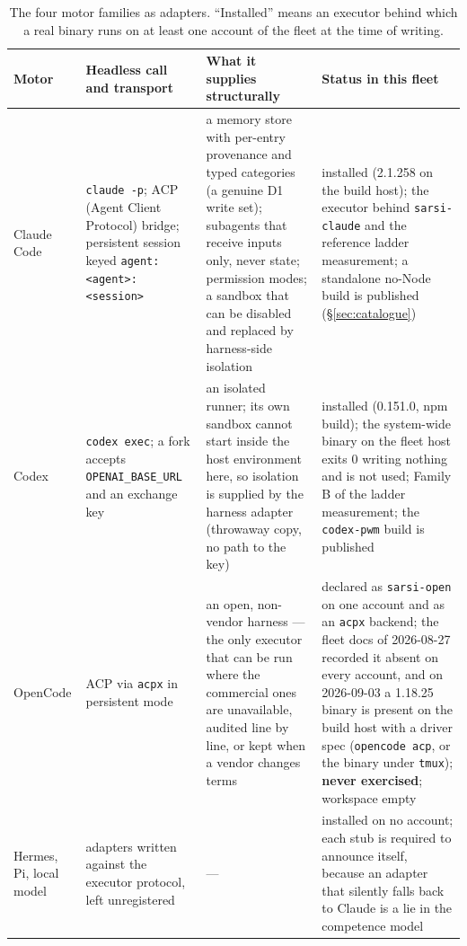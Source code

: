 \documentclass[11pt]{article}
\theoremstyle{definition}
\begin{document}
\begin{table}[H]
\centering\small
\begin{tabularx}{\textwidth}{@{}lYYY@{}}
\toprule
Motor & Headless call and transport & What it supplies structurally & Status in this fleet \\
\midrule
Claude Code & \texttt{claude -p}; ACP (Agent Client Protocol) bridge; persistent session keyed \texttt{agent:}\allowbreak\texttt{<agent>:}\allowbreak\texttt{<session>} & a memory store with per-entry provenance and typed categories (a genuine D1 write set); subagents that receive inputs only, never state; permission modes; a sandbox that can be disabled and replaced by harness-side isolation & installed (2.1.258 on the build host); the executor behind \texttt{sarsi-claude} and the reference ladder measurement; a standalone no-Node build is published (\S\ref{sec:catalogue}) \\
Codex & \texttt{codex exec}; a fork accepts \texttt{OPENAI\_BASE\_URL} and an exchange key & an isolated runner; its own sandbox cannot start inside the host environment here, so isolation is supplied by the harness adapter (throwaway copy, no path to the key) & installed (0.151.0, npm build); the system-wide binary on the fleet host exits 0 writing nothing and is not used; Family B of the ladder measurement; the \texttt{codex-pwm} build is published \\
OpenCode & ACP via \texttt{acpx} in persistent mode & an open, non-vendor harness --- the only executor that can be run where the commercial ones are unavailable, audited line by line, or kept when a vendor changes terms & declared as \texttt{sarsi-open} on one account and as an \texttt{acpx} backend; the fleet docs of 2026-08-27 recorded it absent on every account, and on 2026-09-03 a 1.18.25 binary is present on the build host with a driver spec (\texttt{opencode acp}, or the binary under \texttt{tmux}); \textbf{never exercised}; workspace empty \\
Hermes, Pi, local model & adapters written against the executor protocol, left unregistered & --- & installed on no account; each stub is required to announce itself, because an adapter that silently falls back to Claude is a lie in the competence model \\
\bottomrule
\end{tabularx}
\caption{The four motor families as adapters. ``Installed'' means an executor behind which a real binary runs on at least one account of the fleet at the time of writing.}
\label{tab:motors}
\end{table}
\end{document}
